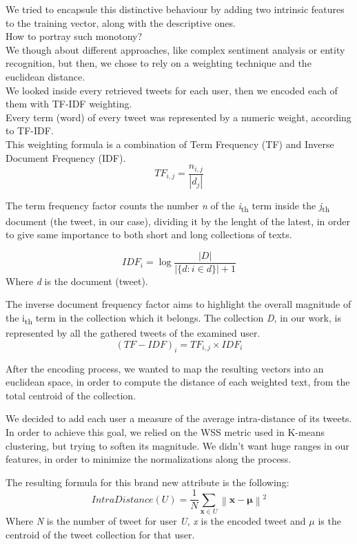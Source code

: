 We tried to encapsule this distinctive behaviour by adding two intrinsic features to the training vector, along with the descriptive ones.\\

How to portray such monotony?\\
We though about different approaches, like complex sentiment analysis or entity recognition, but then, we chose to rely on a weighting technique and the euclidean distance.\\
We looked inside every retrieved tweets for each user, then we encoded each of them with TF-IDF weighting.\\

Every term (word) of every tweet was represented by a numeric weight, according to TF-IDF.\\
This weighting formula is a combination of Term Frequency (TF) and Inverse Document Frequency (IDF).
\[ TF_{i,j} =\frac {n_{i,j}}{|d_{j}|} \]

The term frequency factor counts the number \textit{n} of the \textit{i}\textsubscript{th} term inside the \textit{j}\textsubscript{th} document (the tweet, in our case), dividing it by the lenght of the latest, in order to give same importance to both short and long collections of texts.

\[ IDF_{i} =\log {\frac {|D|}{|\{d:i\in d\}| + 1}} \]
Where \textit{d} is the document (tweet).

The inverse document frequency factor aims to highlight the overall magnitude of the  i\textsubscript{th} term in the collection  which it belongs. The collection \textit{D}, in our work, is represented by all the gathered tweets of the examined user.
\[(TF-IDF)_{i} = TF_{i,j} \times IDF_{i} \]

After the encoding process, we wanted to map the resulting vectors into an euclidean space, in order to compute the distance of each weighted text, from the total centroid of the collection.

We decided to add each user a measure of the average intra-distance of its tweets.\\
In order to achieve this goal, we relied on the WSS metric used in K-means clustering, but trying to soften its magnitude. We didn't want huge ranges in our features, in order to minimize the normalizations along the process.

The resulting formula for this brand new attribute is the following:
\[IntraDistance(U) = \frac{1}{N}\sum _{\mathbf {x} \in U}\left\|\mathbf {x} -{\boldsymbol {\mu }}\right\|^{2}\]
Where \textit{N} is the number of tweet for user \textit{U}, \textit{x} is the encoded tweet and $\mu$ is the centroid of the tweet collection for that user.

